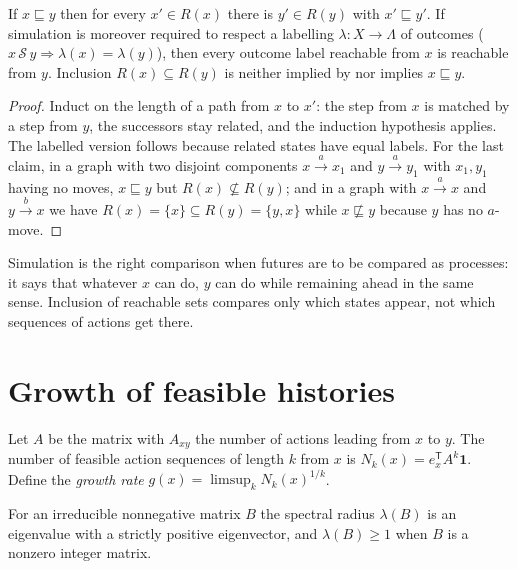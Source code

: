 \begin{newresult}\label{prop:sim}
If $x\sqsubseteq y$ then for every $x'\in R(x)$ there is $y'\in R(y)$ with $x'\sqsubseteq y'$. If simulation is moreover required to respect a labelling $\lambda:X\to\Lambda$ of outcomes ($x\,\mathcal S\,y\Rightarrow\lambda(x)=\lambda(y)$), then every outcome label reachable from $x$ is reachable from $y$. Inclusion $R(x)\subseteq R(y)$ is neither implied by nor implies $x\sqsubseteq y$.
\end{newresult}
\begin{proof}
Induct on the length of a path from $x$ to $x'$: the step from $x$ is matched by a step from $y$, the successors stay related, and the induction hypothesis applies. The labelled version follows because related states have equal labels. For the last claim, in a graph with two disjoint components $x\xrightarrow{a}x_1$ and $y\xrightarrow{a}y_1$ with $x_1,y_1$ having no moves, $x\sqsubseteq y$ but $R(x)\not\subseteq R(y)$; and in a graph with $x\xrightarrow{a}x$ and $y\xrightarrow{b}x$ we have $R(x)=\{x\}\subseteq R(y)=\{y,x\}$ while $x\not\sqsubseteq y$ because $y$ has no $a$-move.
\end{proof}

Simulation is the right comparison when futures are to be compared as processes: it says that whatever $x$ can do, $y$ can do while remaining ahead in the same sense. Inclusion of reachable sets compares only which states appear, not which sequences of actions get there.

\section{Growth of feasible histories}

Let $A$ be the matrix with $A_{xy}$ the number of actions leading from $x$ to $y$. The number of feasible action sequences of length $k$ from $x$ is $N_k(x)=e_x^{\mathsf T}A^k\mathbf 1$. Define the \emph{growth rate} $g(x)=\limsup_k N_k(x)^{1/k}$.

\begin{established}\label{thm:pf}
For an irreducible nonnegative matrix $B$ the spectral radius $\lambda(B)$ is an eigenvalue with a strictly positive eigenvector, and $\lambda(B)\ge1$ when $B$ is a nonzero integer matrix.
\end{established}

